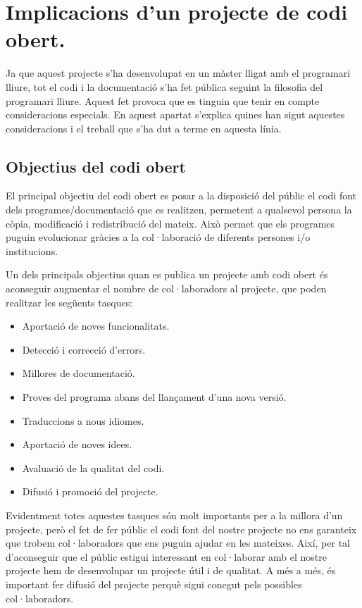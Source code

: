 \chapter{Implicacions d'un projecte de codi obert.}
\label{chap:codi_obert}

Ja que aquest projecte s'ha desenvolupat en un màster lligat amb el programari lliure, tot el codi i la documentació s'ha fet pública seguint la filosofia del programari lliure. Aquest fet provoca que es tinguin que tenir en compte consideracions especials. En aquest apartat s'explica quines han sigut aquestes consideracions i el treball que s'ha dut a terme en aquesta línia. 

\section{Objectius del codi obert}

El principal objectiu del codi obert es posar a la disposició del públic el codi font dels programes/documentació que es realitzen, permetent a qualsevol persona la còpia, modificació i redistribució del mateix. Això permet que els programes puguin evolucionar gràcies a la col·laboració de diferents persones i/o institucions.

Un dels principals objectius quan es publica un projecte amb codi obert és aconseguir augmentar el nombre de col·laboradors al projecte, que poden realitzar les següents tasques:

\begin{itemize}
\item{Aportació de noves funcionalitats.}
\item{Detecció i correcció d'errors.}
\item{Millores de documentació.}
\item{Proves del programa abans del llançament d'una nova versió.}
\item{Traduccions a nous idiomes.}
\item{Aportació de noves idees.}
\item{Avaluació de la qualitat del codi.}
\item{Difusió i promoció del projecte.}
\end{itemize}

Evidentment totes aquestes tasques són molt importants per a la millora d'un projecte, però el fet de fer públic el codi font del nostre projecte no ens garanteix que trobem col·laboradors que ens puguin ajudar en les mateixes. Així, per tal d'aconseguir que el públic estigui interessant en col·laborar amb el nostre projecte hem de desenvolupar un projecte útil i de qualitat. A més a més, és important fer difusió del projecte perquè sigui conegut pels possibles col·laboradors.  

